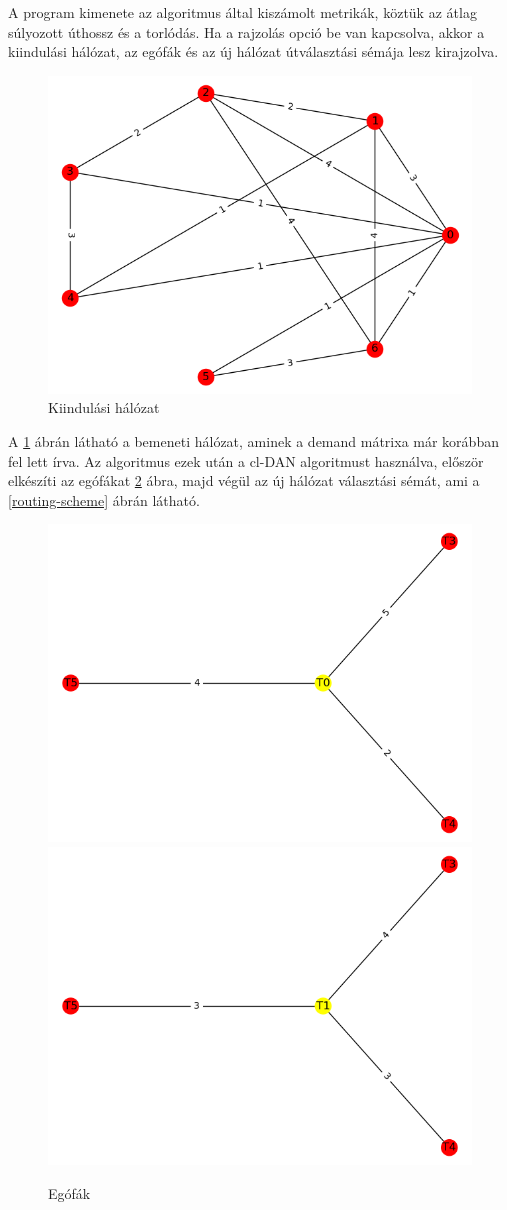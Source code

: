 \documentclass[12pt]{report}
\begin{document}
A program kimenete az algoritmus által kiszámolt metrikák, köztük az átlag súlyozott úthossz és a torlódás. 
Ha a rajzolás opció be van kapcsolva, akkor a kiindulási hálózat, az egófák és az új hálózat 
útválasztási sémája lesz kirajzolva.

\begin{figure}[H]
	\begin{center}
		\includegraphics[width=0.49\linewidth]{pictures/starting_network.png}
		\caption{Kiindulási hálózat}
		\label{starting-network}
	\end{center}
\end{figure}

A \ref{starting-network} ábrán látható a bemeneti hálózat, aminek a demand mátrixa már korábban fel lett írva. Az algoritmus ezek után a cl-DAN algoritmust használva, először elkészíti az egófákat \ref{ego-trees} ábra, majd végül az új hálózat választási sémát, ami a \ref{routing-scheme} ábrán látható.

\begin{figure}[H]
	\begin{center}
		\includegraphics[width=0.40\linewidth]{pictures/egotree1.png}
		\includegraphics[width=0.40\linewidth]{pictures/egotree2.png}
		\caption{Egófák}
		\label{ego-trees}
	\end{center}
\end{figure}
\end{document}
